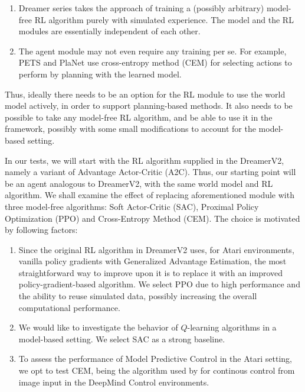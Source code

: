 \documentclass[en]{pracamgr}
\begin{document}
\begin{enumerate}
  \item Dreamer series takes the approach of training a (possibly arbitrary) model-free RL algorithm purely with simulated experience. The model and the RL modules are essentially independent of each other.
  \item The agent module may not even require any training per se. For example, PETS \autocite{chuaDeepReinforcementLearning2018} and PlaNet \autocite{hafnerLearningLatentDynamics2019} use cross-entropy method (CEM) for selecting actions to perform by planning with the learned model.
\end{enumerate}

Thus, ideally there needs to be an option for the RL module to use the world model actively, in order to support planning-based methods. It also needs to be possible to take any model-free RL algorithm, and be able to use it in the framework, possibly with some small modifications to account for the model-based setting.

In our tests, we will start with the RL algorithm supplied in the DreamerV2, namely a variant of Advantage Actor-Critic (A2C). Thus, our starting point will be an agent analogous to DreamerV2, with the same world model and RL algorithm. We shall examine the effect of replacing aforementioned module with three model-free algorithms: Soft Actor-Critic (SAC), Proximal Policy Optimization (PPO) and Cross-Entropy Method (CEM). The choice is motivated by following factors:

\begin{enumerate}
  \item Since the original RL algorithm in DreamerV2 uses, for Atari environments, vanilla policy gradients with Generalized Advantage Estimation, the most straightforward way to improve upon it is to replace it with an improved policy-gradient-based algorithm. We select PPO due to high performance and the ability to reuse simulated data, possibly increasing the overall computational performance.
  \item We would like to investigate the behavior of $Q$-learning algorithms in a model-based setting. We select SAC as a strong baseline.
  \item To assess the performance of Model Predictive Control in the Atari setting, we opt to test CEM, being the algorithm used by \autocite{hafnerLearningLatentDynamics2019} for continous control from image input in the DeepMind Control environments.
\end{enumerate}
\end{document}
